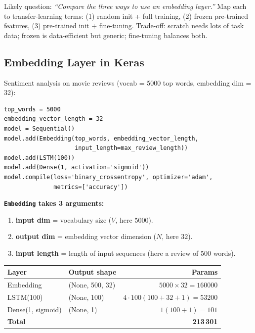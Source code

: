 \documentclass[10pt,a4paper]{article}
\begin{document}
	\begin{examtipbox}
		Likely question: \emph{``Compare the three ways to use an embedding layer.''} Map each to transfer-learning terms: (1) random init + full training, (2) frozen pre-trained features, (3) pre-trained init + fine-tuning. Trade-off: scratch needs lots of task data; frozen is data-efficient but generic; fine-tuning balances both.
	\end{examtipbox}

	\subsection{Embedding Layer in Keras}

	Sentiment analysis on movie reviews (vocab = 5000 top words, embedding dim = 32):
\begin{verbatim}
top_words = 5000
embedding_vector_length = 32
model = Sequential()
model.add(Embedding(top_words, embedding_vector_length,
                    input_length=max_review_length))
model.add(LSTM(100))
model.add(Dense(1, activation='sigmoid'))
model.compile(loss='binary_crossentropy', optimizer='adam',
              metrics=['accuracy'])
\end{verbatim}

	\textbf{\texttt{Embedding} takes 3 arguments:}
	\begin{enumerate}[leftmargin=*, nosep]
		\item \textbf{input dim} = vocabulary size ($V$, here $5000$).
		\item \textbf{output dim} = embedding vector dimension ($N$, here $32$).
		\item \textbf{input length} = length of input sequences (here a review of $500$ words).
	\end{enumerate}

	\begin{center}
	\begin{tabular}{llr}
		\toprule
		Layer & Output shape & Params \\
		\midrule
		Embedding & (None, 500, 32) & $5000\times 32 = 160000$ \\
		LSTM(100) & (None, 100)     & $4\cdot 100(100{+}32{+}1) = 53200$ \\
		Dense(1, sigmoid) & (None, 1) & $1(100{+}1) = 101$ \\
		\midrule
		\textbf{Total} & & \textbf{213\,301} \\
		\bottomrule
	\end{tabular}
	\end{center}
\end{document}
